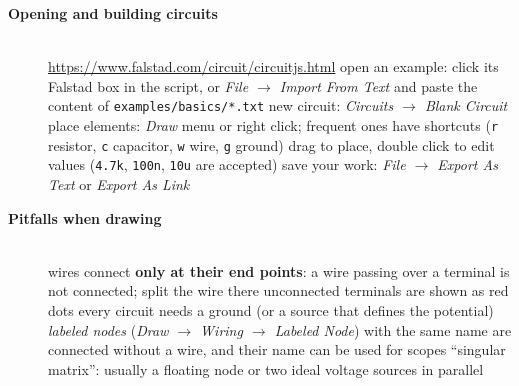 \begin{description}
\item[{\rot\bf Opening and building circuits}]~\\[-\lblskip]
\bi
	\ite \url{https://www.falstad.com/circuit/circuitjs.html}
	\ite open an example: click its Falstad box in the script, or \emph{File $\rightarrow$ Import From Text} and paste the content of \texttt{examples/basics/*.txt}
	\ite new circuit: \emph{Circuits $\rightarrow$ Blank Circuit}
	\ite place elements: \emph{Draw} menu or right click; frequent ones have shortcuts (\texttt{r} resistor, \texttt{c} capacitor, \texttt{w} wire, \texttt{g} ground)
	\ite drag to place, double click to edit values (\texttt{4.7k}, \texttt{100n}, \texttt{10u} are accepted)
	\ite save your work: \emph{File $\rightarrow$ Export As Text} or \emph{Export As Link}
\ei
\os{\newpage}

\item[{\rot\bf Pitfalls when drawing}]~\\[-\lblskip]
\bi
	\ite wires connect \textbf{only at their end points}: a wire passing over a terminal is not connected; split the wire there
	\ite unconnected terminals are shown as red dots
	\ite every circuit needs a ground (or a source that defines the potential)
	\ite \emph{labeled nodes} (\emph{Draw $\rightarrow$ Wiring $\rightarrow$ Labeled Node}) with the same name are connected without a wire, and their name can be used for scopes
	\ite ``singular matrix'': usually a floating node or two ideal voltage sources in parallel
\ei
{}
\os{\newpage}


\end{description}
